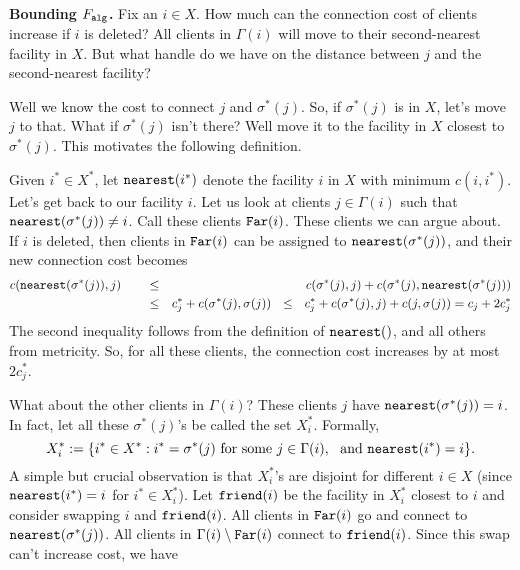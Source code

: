 \documentclass[11pt]{article}
\def\alg{{\tt alg}}
\begin{document}
\noindent
{\bf Bounding $F_{\alg}$.} Fix an $i\in X$. How much can the connection cost of clients increase if $i$ is deleted? All clients in $\Gamma(i)$ will move to their second-nearest facility in $X$. But what handle do we have on the distance between $j$ and the second-nearest facility?

Well we know the cost to connect $j$ and $\sigma^*(j)$. So, if $\sigma^*(j)$ is in $X$, let's move $j$ to that. 
What if $\sigma^*(j)$ isn't there? Well move it to the facility in $X$ closest to $\sigma^*(j)$. This 
motivates the following definition. 

\def\near{{\tt nearest}}
\def\bad{{\tt bad}}
\def\Far{{\tt Far}}
\def\friend{{\tt friend}}

Given $i^*\in X^*$, let $\near(i^*)$ denote the facility $i$ in $X$ with minimum $c(i,i^*)$. 
Let's get back to our facility $i$. Let us look at clients $j\in \Gamma(i)$ such that $\near(\sigma^*(j)) \neq i$.
Call these clients $\Far(i)$. These clients we can argue about. 
If $i$ is deleted, then clients in $\Far(i)$ can be assigned to 
$\near(\sigma^*(j))$, and their new connection cost becomes 
\begin{align*}
c(\near(\sigma^*(j)), j) & \qquad \le & c(\sigma^*(j),j) + c(\sigma^*(j),\near(\sigma^*(j))) \\
&\qquad \le &  c^*_j+ c(\sigma^*(j), \sigma(j)) ~~ \le ~~ c^*_j + c(\sigma^*(j),j) + c(j,\sigma(j)) = c_j + 2c^*_j
\end{align*}
The second inequality follows from the definition of $\near()$, and all others from metricity.
So, for all these clients, the connection cost increases by at most $2c^*_j$.  

What about the other clients in $\Gamma(i)$? These clients $j$ have $\near(\sigma^*(j)) = i$. 
In fact, let all these $\sigma^*(j)$'s be called the set $X^*_i$. Formally,
\begin{equation}\label{eq:Xidefn}
X^*_i := \{i^* \in X^*: i^* = \sigma^*(j) \mbox{ for some } j\in \Gamma(i), ~\mbox{ and } \near(i^*) = i\}.
\end{equation}
\noindent
A simple but crucial observation is that $X^*_i$'s are disjoint for different $i\in X$ (since $\near(i^*) = i$ for
$i^*\in X^*_i$). Let $\friend(i)$ be the facility in $X^*_i$ closest to $i$ and consider swapping $i$ and $\friend(i)$.
All clients in $\Far(i)$ go and connect to $\near(\sigma^*(j))$. All clients in $\Gamma(i)\setminus \Far(i)$
connect to $\friend(i)$. Since this swap can't increase cost, we have
\end{document}
